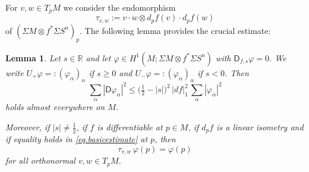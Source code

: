 \documentclass[11pt,reqno]{amsart}
\newcommand{\ns}{\nabla^s}
\newcommand{\R}{\mathbb{R}}
\newcommand{\D}{\mathsf{D}}
\renewcommand{\phi}{\varphi}
\newcommand{\<}{\langle}
\renewcommand{\>}{\rangle}
\newtheorem{lemma}{Lemma}
\theoremstyle{definition}
\begin{document}

For $v,w\in T_pM$ we consider the endomorphism 
$$
\tau_{v,w}:=v\cdot w\otimes d_pf(v)\cdot d_pf(w)
$$
of $(\Sigma M\otimes f^*\Sigma S^n)_p$.
The following lemma provides the crucial estimate:

\begin{lemma}\label{lem.basicestimate}
Let $s\in\R$ and let $\phi \in H^1(M;\Sigma M\otimes f^*\Sigma S^n)$ with $\D_{f,s}\phi=0$.
We write $U_+\phi =: (\phi_\alpha)_\alpha$ if $s\ge0$ and $U_-\phi =: (\phi_\alpha)_\alpha$ if $s<0$.
Then
\begin{equation}
\sum_\alpha |\D\phi_\alpha|^2
\le
\big(\tfrac12-|s|\big)^2\, |df|_1^2 \,\sum_\alpha |\phi_\alpha|^2
\label{eq.basicestimate}
\end{equation}
holds almost everywhere on $M$.

Moreover, if $|s|\neq\frac12$, if $f$ is differentiable at $p\in M$, if $d_pf$ is a linear isometry and if equality holds in \eqref{eq.basicestimate} at $p$, then
\begin{equation}
\tau_{v,w}\,\phi(p) = \phi(p)
\label{eq.vwrigid}
\end{equation}
for all orthonormal $v,w\in T_pM$.
\end{lemma}
\end{document}
